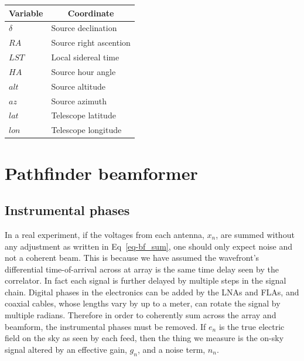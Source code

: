 \begin{table}[]
\centering
\label{tab-coord_var}
\begin{tabular}{ll}
\multicolumn{1}{c}{\textbf{Variable}} & \multicolumn{1}{c}{\textbf{Coordinate}} \\ \hline
$\delta$                              & Source declination                      \\
$RA$                                    & Source right ascention                  \\
$LST$                                   & Local sidereal time                     \\
$HA$                                    & Source hour angle                       \\
$alt$                                   & Source altitude                         \\
$az$                                    & Source azimuth                          \\
$lat$                                   & Telescope latitude                      \\
$lon$                                   & Telescope longitude                    
\end{tabular}
\end{table}

\section{Pathfinder beamformer}

\subsection{Instrumental phases}
\label{sec-instr_phases}
In a real experiment, if the voltages from each antenna, $x_n$, are summed 
without any adjustment as written in Eq~\ref{eq-bf_sum}, one should only 
expect noise and not a coherent beam. This is because we have assumed 
the wavefront's differential time-of-arrival across at array 
is the same time delay seen by the correlator. In fact each 
signal is further delayed by multiple steps in the signal chain. 
Digital phases in the electronics can be added by the LNAs and FLAs, and
coaxial cables, whose lengths vary by up to a meter, can rotate 
the signal by multiple radians. Therefore in order to coherently sum 
across the array and beamform, the instrumental phases must be removed. 
If $e_n$ is the true electric field on the 
sky as seen by each feed, then the thing we measure is the on-sky signal
altered by an effective gain, $g_n$, and a noise term, $n_n$.

